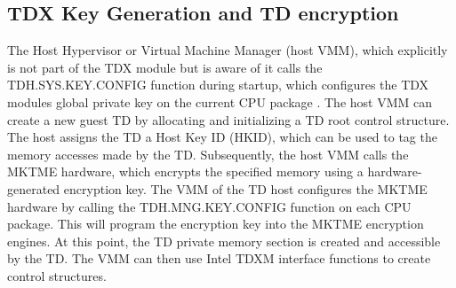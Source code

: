 \subsection{TDX Key Generation and TD encryption}
The Host Hypervisor or Virtual Machine Manager (host VMM), which explicitly is not part of the TDX module but is aware of it calls the TDH.SYS.KEY.CONFIG function during startup, which configures the TDX modules global private key on the current CPU package \cite{intel_corporation_intel-tdx-module-15-abi-spec-348551001pdf_2024}.  The host VMM can create a new guest TD by allocating and initializing a TD root control structure. The host assigns the TD a Host Key ID (HKID), which can be used to tag the memory accesses made by the TD\cite{noauthor_tdx-module-10-public-specpdf_nodate}. Subsequently, the host VMM calls the MKTME hardware, which encrypts the specified memory using a hardware-generated encryption key\cite{noauthor_multi-key-total-memory-encryption-spec-14pdf_nodate}. The VMM of the TD host configures the MKTME hardware by calling the TDH.MNG.KEY.CONFIG function on each CPU package. This will program the encryption key into the MKTME encryption engines\cite{noauthor_tdx-module-10-public-specpdf_nodate}. At this point, the TD private memory section is created and accessible by the TD. The VMM can then use Intel TDXM interface functions to create control structures. 

